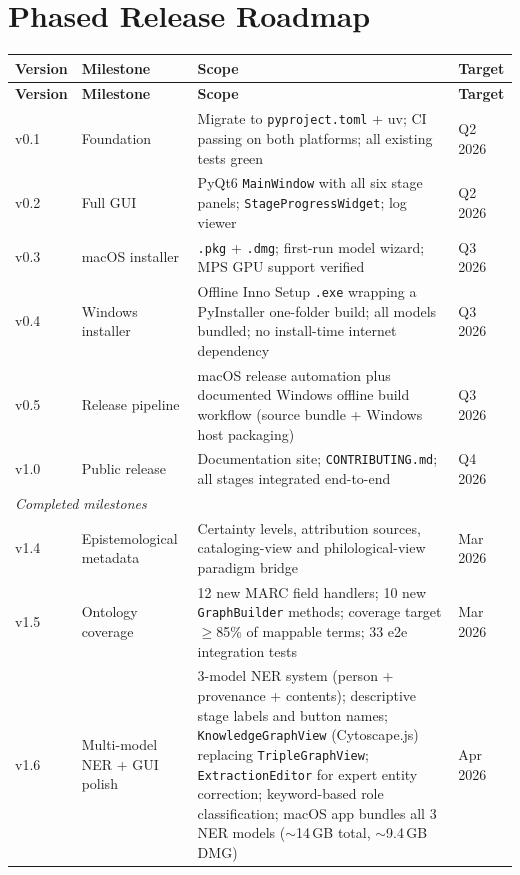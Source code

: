 \documentclass[12pt]{article}
\newcommand{\code}[1]{\texttt{#1}}
\begin{document}
\section{Phased Release Roadmap}
\label{sec:roadmap}

\begin{longtable}{|l|l|p{5cm}|l|}
\hline
\textbf{Version} & \textbf{Milestone} & \textbf{Scope} & \textbf{Target} \\
\hline
\endfirsthead
\hline
\textbf{Version} & \textbf{Milestone} & \textbf{Scope} & \textbf{Target} \\
\hline
\endhead
\hline
\endfoot
v0.1 & Foundation & Migrate to \code{pyproject.toml} + uv; CI passing on both platforms; all existing tests green & Q2 2026 \\
\hline
v0.2 & Full GUI & PyQt6 \code{MainWindow} with all six stage panels; \code{StageProgressWidget}; log viewer & Q2 2026 \\
\hline
v0.3 & macOS installer & \code{.pkg} + \code{.dmg}; first-run model wizard; MPS GPU support verified & Q3 2026 \\
\hline
v0.4 & Windows installer & Offline Inno Setup \code{.exe} wrapping a PyInstaller one-folder build; all models bundled; no install-time internet dependency & Q3 2026 \\
\hline
v0.5 & Release pipeline & macOS release automation plus documented Windows offline build workflow (source bundle + Windows host packaging) & Q3 2026 \\
\hline
v1.0 & Public release & Documentation site; \code{CONTRIBUTING.md}; all stages integrated end-to-end & Q4 2026 \\
\hline
\multicolumn{4}{|l|}{\textit{Completed milestones}} \\
\hline
v1.4 & Epistemological metadata & Certainty levels, attribution sources, cataloging-view and philological-view paradigm bridge & Mar 2026 \\
\hline
v1.5 & Ontology coverage & 12 new MARC field handlers; 10 new \code{GraphBuilder} methods; coverage target $\geq$85\% of mappable terms; 33 e2e integration tests & Mar 2026 \\
\hline
v1.6 & Multi-model NER + GUI polish & 3-model NER system (person + provenance + contents); descriptive stage labels and button names; \code{KnowledgeGraphView} (Cytoscape.js) replacing \code{TripleGraphView}; \code{ExtractionEditor} for expert entity correction; keyword-based role classification; macOS app bundles all 3 NER models ($\sim$14\,GB total, $\sim$9.4\,GB DMG) & Apr 2026 \\

\end{longtable}
\end{document}

